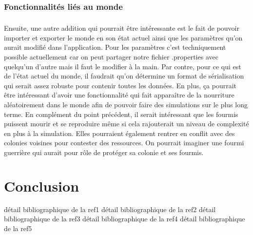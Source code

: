 \documentclass{EPUProjetDi}
\begin{document}
\subsection{Fonctionnalités liés au monde}
\paragraph{}
Ensuite, une autre addition qui pourrait être intéressante est le fait de pouvoir importer et exporter le monde en son état actuel ainsi que les paramètres qu'on aurait modifié dans l'application.
Pour les paramètres c'est techniquement possible actuellement car on peut partager notre fichier .properties avec quelqu'un d'autre mais il faut le modifier à la main. 
Par contre, pour ce qui est de l'état actuel du monde, il faudrait qu'on détermine un format de sérialisation qui serait assez robuste pour contenir toutes les données.
En plus, ça pourrait être intéressant d'avoir une fonctionnalité qui fait apparaître de la nourriture aléatoirement dans le monde afin de pouvoir faire des simulations sur le plus long terme.
En complément du point précédent, il serait intéressant que les fourmis puissent mourir et se reproduire même si cela rajouterait un niveau de complexité en plus à la simulation. 
Elles pourraient également rentrer en conflit avec des colonies voisines pour contester des ressources. On pourrait imaginer une fourmi guerrière qui aurait pour rôle de protéger sa colonie et ses fourmis.

\chapter*{Conclusion}


\begin{thebibliography}{99}
\label{sec:biblio}
  détail bibliographique de la ref1
  détail bibliographique de la ref2
  détail bibliographique de la ref3
  détail bibliographique de la ref4
  détail bibliographique de la ref5
\end{thebibliography}


\appendix
{}
\end{document}
